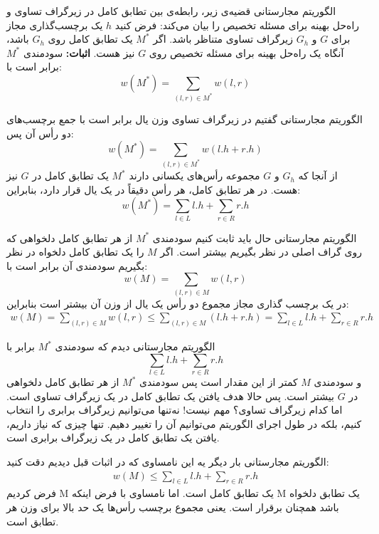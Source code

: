 \begin{itemframe}{الگوریتم مجارستانی}
\itm
قضیه‌ی زیر، رابطه‌ی بین تطابق کامل در زیرگراف تساوی و راه‌حل بهینه برای مسئله تخصیص را بیان می‌کند:
\itm
فرض کنید $h$ یک برچسب‌گذاری مجاز برای $G$ و $G_h$ زیرگراف تساوی متناظر باشد. اگر $M^*$ یک تطابق کامل روی $G_h$ باشد، آنگاه یک راه‌حل بهینه برای مسئله تخصیص روی $G$ نیز هست.
\itm
\textbf{اثبات:}
سودمندی $M^*$ برابر است با:
$$
w(M^\ast) = \sum_{(l, r) \in M^\ast} w(l, r)
$$
\end{itemframe}


\begin{itemframe}{الگوریتم مجارستانی}
\itm
گفتیم در زیرگراف تساوی وزن یال برابر است با جمع برچسب‌های دو رأس آن پس:
$$
w(M^\ast) = \sum_{(l, r) \in M^\ast} w(l.h + r.h)
$$
\itm
از آنجا که $G_h$ و $G$ مجموعه رأس‌های یکسانی دارند $M^\ast$ یک تطابق کامل در $G$ نیز هست. در هر تطابق کامل، هر رأس دقیقاً در یک یال قرار دارد، بنابراین:
$$
w(M^\ast) = \sum_{l \in L} l.h + \sum_{r \in R} r.h
$$
\end{itemframe}


\begin{itemframe}{الگوریتم مجارستانی}
\itm
حال باید ثابت کنیم سودمندی $M^\ast$ از هر تطابق کامل دلخواهی که روی گراف اصلی در نظر بگیریم بیشتر است. اگر $M$  را یک تطابق کامل دلخواه در نظر بگیریم سودمندی آن برابر است با:
$$
w(M) = \sum_{(l, r) \in M} w(l, r)
$$
\itm
در یک برچسب گذاری مجاز مجموع دو رأس یک یال از وزن آن بیشتر است بنابراین:
\begin{align*}
w(M) = \sum_{(l, r) \in M} w(l, r) \leq \sum_{(l, r) \in M} (l.h + r.h) = \sum_{l \in L} l.h + \sum_{r \in R} r.h
\end{align*}
\end{itemframe}


\begin{itemframe}{الگوریتم مجارستانی}
\itm
دیدم که سودمندی $M^\ast$ برابر با
$$
\sum_{l \in L} l.h + \sum_{r \in R} r.h
$$
و سودمندی $M$ کمتر از این مقدار است پس سودمندی $M^\ast$ از هر تطابق کامل دلخواهی در $G‌$ بیشتر است.
\itm
پس حالا هدف یافتن یک تطابق کامل در یک زیرگراف تساوی است. اما کدام زیرگراف تساوی؟ مهم نیست!
نه‌تنها می‌توانیم زیرگراف برابری را انتخاب کنیم، بلکه در طول اجرای الگوریتم می‌توانیم آن را تغییر دهیم. تنها چیزی که نیاز داریم، یافتن یک تطابق کامل در یک زیرگراف برابری است.
\end{itemframe}


\begin{itemframe}{الگوریتم مجارستانی}
\itm
بار دیگر یه این نامساوی که در اثبات قبل دیدیم دقت کنید:
\begin{align*}
w(M) \leq \sum_{l \in L} l.h + \sum_{r \in R} r.h
\end{align*}
\itm
فرض کردیم M یک تطابق کامل است. اما نامساوی با فرض اینکه M یک تطابق دلخواه باشد همچنان برقرار است.
\itm
یعنی مجموع برچسب رأس‌ها یک حد بالا برای وزن هر تطابق است.
\end{itemframe}


